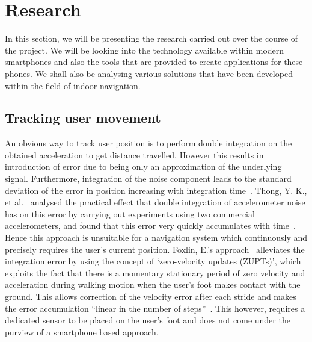 \documentclass[main.tex]{subfiles}
\begin{document}
\chapter{Research}

In this section, we will be presenting the research carried out over the course of the project. We will be looking into the technology available within modern smartphones and also the tools that are provided to create applications for these phones. We shall also be analysing various solutions that have been developed within the field of indoor navigation.

 \section{Tracking user movement}

An obvious way to track user position is to perform double integration on the obtained acceleration to get distance travelled. However this results in introduction of error due to being only an approximation of the underlying signal. Furthermore, integration of the noise component leads to the standard deviation of the error in position increasing with integration time~\cite[p.73]{integrationError}. Thong, Y. K., et al.~\cite{integrationErrorPractical} analysed the practical effect that double integration of accelerometer noise has on this error by carrying out experiments using two commercial accelerometers, and found that this error very quickly accumulates with time~\cite[p.1168]{integrationErrorPractical}. Hence this approach is unsuitable for a navigation system which continuously and precisely requires the user’s current position. Foxlin, E.'s approach~\cite{foxlin2005pedestrian} alleviates the integration error by using the concept of `zero-velocity updates (ZUPTs)’, which exploits the fact that there is a momentary stationary period of zero velocity and acceleration during walking motion when the user’s foot makes contact with the ground. This allows correction of the velocity error after each stride and makes the error accumulation ``linear in the number of steps''~\cite[p.38]{foxlin2005pedestrian}. This however, requires a dedicated sensor to be placed on the user’s foot and does not come under the purview of a smartphone based approach. 
\end{document}
